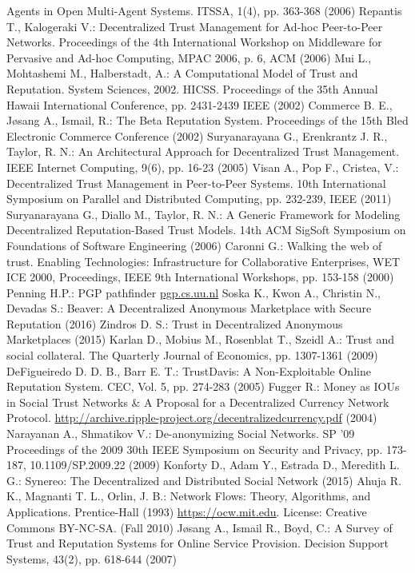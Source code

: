\documentclass[11pt]{llncs}
\theoremstyle{definition}
\begin{document}
\begin{thebibliography}{40}
     Agents in Open Multi-Agent Systems. ITSSA, 1(4), pp. 363-368 (2006)
     Repantis T., Kalogeraki V.: Decentralized Trust Management for Ad-hoc Peer-to-Peer Networks. Proceedings of the 4th
     International Workshop on Middleware for Pervasive and Ad-hoc Computing, MPAC 2006, p. 6, ACM (2006)
     Mui L., Mohtashemi M., Halberstadt, A.: A Computational Model of Trust and Reputation. System Sciences, 2002. HICSS.
     Proceedings of the 35th Annual Hawaii International Conference, pp. 2431-2439 IEEE (2002)
     Commerce B. E., J\o{}sang A., Ismail, R.: The Beta Reputation System. Proceedings of the 15th Bled Electronic Commerce
     Conference (2002)
     Suryanarayana G., Erenkrantz J. R., Taylor, R. N.: An Architectural Approach for Decentralized Trust Management. IEEE
     Internet Computing, 9(6), pp. 16-23 (2005)
     Visan A., Pop F., Cristea, V.: Decentralized Trust Management in Peer-to-Peer Systems. 10th International Symposium on
     Parallel and Distributed Computing, pp. 232-239, IEEE (2011)
     Suryanarayana G., Diallo M., Taylor, R. N.: A Generic Framework for Modeling Decentralized Reputation-Based Trust Models.
     14th ACM SigSoft Symposium on Foundations of Software Engineering (2006)
     Caronni G.: Walking the web of trust. Enabling Technologies: Infrastructure for Collaborative Enterprises, WET ICE 2000,
     Proceedings, IEEE 9th International Workshops, pp. 153-158 (2000)
     Penning H.P.: PGP pathfinder \url{pgp.cs.uu.nl}
     Soska K., Kwon A., Christin N., Devadas S.: Beaver: A Decentralized Anonymous Marketplace with Secure Reputation (2016)
     Zindros D. S.: Trust in Decentralized Anonymous Marketplaces (2015)
     Karlan D., Mobius M., Rosenblat T., Szeidl A.: Trust and social collateral. The Quarterly Journal of Economics, pp.
     1307-1361 (2009)
     DeFigueiredo D. D. B., Barr E. T.: TrustDavis: A Non-Exploitable Online Reputation System. CEC, Vol. 5, pp. 274-283
     (2005)
     Fugger R.: Money as IOUs in Social Trust Networks \& A Proposal for a Decentralized Currency Network Protocol.
     \url{http://archive.ripple-project.org/decentralizedcurrency.pdf} (2004)
     Narayanan A., Shmatikov V.: De-anonymizing Social Networks. SP '09 Proceedings of the 2009 30th IEEE Symposium on
     Security and Privacy, pp. 173-187, 10.1109/SP.2009.22 (2009)
     Konforty D., Adam Y., Estrada D., Meredith L. G.: Synereo: The Decentralized and Distributed Social Network (2015)
     Ahuja R. K., Magnanti T. L., Orlin, J. B.: Network Flows: Theory, Algorithms, and Applications. Prentice-Hall (1993)
     \url{https://ocw.mit.edu}. License: Creative Commons BY-NC-SA. (Fall 2010)
     J\o{}sang A., Ismail R., Boyd, C.: A Survey of Trust and Reputation Systems for Online Service Provision. Decision
     Support Systems, 43(2), pp. 618-644 (2007)
  \end{thebibliography}
\end{document}
